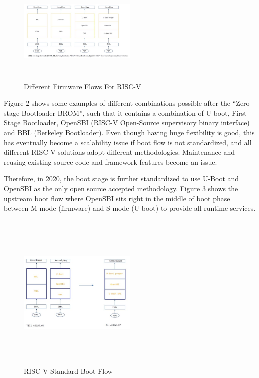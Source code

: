 \documentclass[a4paper,fleqn]{cas-dc}
\begin{document}
\begin{figure}[hbt!]
	\centering
	\includegraphics[width=0.5\textwidth,height=2in]{figs/DifferentFirmwareFlowsForRiscV.JPG}
	\caption{Different Firmware Flows For RISC-V \cite{R51:1}}
\end{figure}

Figure 2 shows some examples of different combinations possible after the “Zero stage Bootloader BROM”, such that it contains a combination of U-boot, First Stage Bootloader, OpenSBI (RISC-V Open-Source supervisory binary interface) and BBL (Berkeley Bootloader). Even though having huge flexibility is good, this has eventually become a scalability issue if boot flow is not standardized, and all different RISC-V solutions adopt different methodologies. Maintenance and reusing existing source code and framework features become an issue.

Therefore, in 2020, the boot stage is further standardized to use U-Boot and OpenSBI as the only open source accepted methodology. Figure 3 shows the upstream boot flow where OpenSBI sits right in the middle of boot phase between M-mode (firmware) and S-mode (U-boot) to provide all runtime services.

\begin{figure}[hbt!]
	\centering
	\includegraphics[width=0.5\textwidth,height=3in]{figs/RiscVStandardBootFlow.JPG}
	\caption{RISC-V Standard Boot Flow \cite{R51:1}}
\end{figure}
\end{document}
